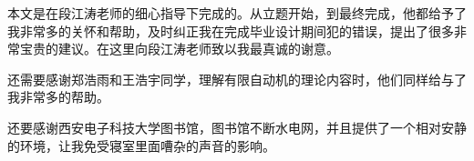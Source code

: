 \begin{thanksfor}
本文是在段江涛老师的细心指导下完成的。从立题开始，到最终完成，他都给予了我非常多的关怀和帮助，及时纠正我在完成毕业设计期间犯的错误，提出了很多非常宝贵的建议。在这里向段江涛老师致以我最真诚的谢意。

还需要感谢郑浩雨和王浩宇同学，理解有限自动机的理论内容时，他们同样给与了我非常多的帮助。

还要感谢西安电子科技大学图书馆，图书馆不断水电网，并且提供了一个相对安静的环境，让我免受寝室里面嘈杂的声音的影响。
\end{thanksfor}